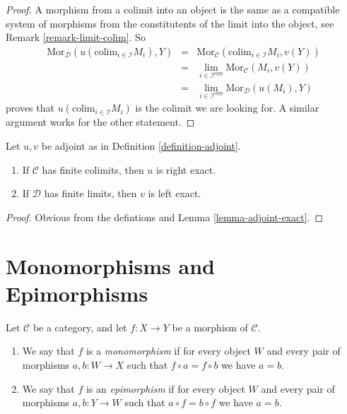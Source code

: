 \begin{proof}
A morphism from a colimit into an object is the same as a compatible
system of morphisms from the constitutents of the limit into the
object, see Remark \ref{remark-limit-colim}. So
$$
\begin{matrix}
\text{Mor}_{\mathcal{D}}(u(\text{colim}_{i \in \mathcal{I}} M_i), Y)
&
=
&
\text{Mor}_{\mathcal{C}}(\text{colim}_{i \in \mathcal{I}} M_i, v(Y))
\\
&
=
&
\lim_{i \in \mathcal{I}^{\text{opp}}} \text{Mor}_{\mathcal{C}}(M_i, v(Y))
\\
&
=
&
\lim_{i \in \mathcal{I}^{\text{opp}}} \text{Mor}_{\mathcal{D}}(u(M_i), Y)
\end{matrix}
$$
proves that $u(\text{colim}_{i \in \mathcal{I}} M_i)$ is
the colimit we are looking for.
A similar argument works for the other statement.
\end{proof}

\begin{lemma}
\label{lemma-exact-adjoint}
Let $u,v$ be adjoint as in Definition \ref{definition-adjoint}.
\begin{enumerate}
\item If $\mathcal{C}$ has finite colimits, then $u$ is right exact.
\item If $\mathcal{D}$ has finite limits, then $v$ is left exact.
\end{enumerate}
\end{lemma}

\begin{proof}
Obvious from the defintions and Lemma \ref{lemma-adjoint-exact}.
\end{proof}


\section{Monomorphisms and Epimorphisms}
\label{section-mono-epi}

\begin{definition}
\label{definition-mono-epi}
Let $\mathcal{C}$ be a category, and let $f : X \to Y$ be
a morphism of $\mathcal{C}$.
\begin{enumerate}
\item We say that $f$ is a {\it monomorphism} if for every object
$W$ and every pair of morphisms $a, b : W \to X$ such that
$f \circ a = f \circ b$ we have $a = b$.
\item We say that $f$ is an {\it epimorphism} if for every object
$W$ and every pair of morphisms $a, b : Y \to W$ such that
$a \circ f = b \circ f$ we have $a = b$.
\end{enumerate}
\end{definition}

